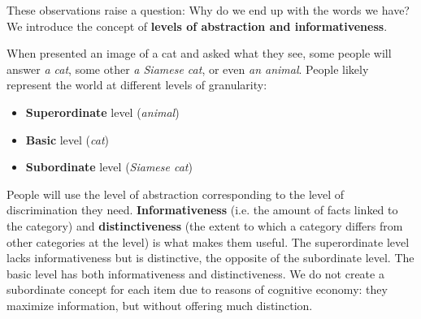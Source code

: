These observations raise a question: Why do we end up with the words we have?
We introduce the concept of \textbf{levels of abstraction and informativeness}.

When presented an image of a cat and asked what they see, some people will answer \textit{a cat}, some other \textit{a Siamese cat}, or even \textit{an animal}.
People likely represent the world at different levels of 
granularity:
\begin{itemize}
    \item \textbf{Superordinate} level (\textit{animal})
    \item \textbf{Basic} level (\textit{cat})
    \item \textbf{Subordinate} level (\textit{Siamese cat})
\end{itemize}
People will use the level of abstraction corresponding to the level of discrimination they need. 
\textbf{Informativeness} (i.e. the amount of facts linked to the category) and \textbf{distinctiveness} (the extent to which a category differs from other categories at the level) is what makes them useful. The superordinate level lacks informativeness but is distinctive, the opposite of the subordinate level. The basic level has both informativeness and distinctiveness. We do not create a subordinate concept for each item due to reasons of cognitive economy: they maximize information, but without offering much distinction.
